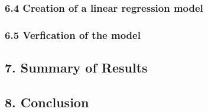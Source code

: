 \documentclass[]{article}
\begin{document}
\hypertarget{creation-of-a-linear-regression-model}{%
\subsubsection{6.4 Creation of a linear regression
model}\label{creation-of-a-linear-regression-model}}

\hypertarget{verfication-of-the-model}{%
\subsubsection{6.5 Verfication of the
model}\label{verfication-of-the-model}}

\hypertarget{summary-of-results}{%
\subsection{7. Summary of Results}\label{summary-of-results}}

\hypertarget{conclusion}{%
\subsection{8. Conclusion}\label{conclusion}}
\end{document}

